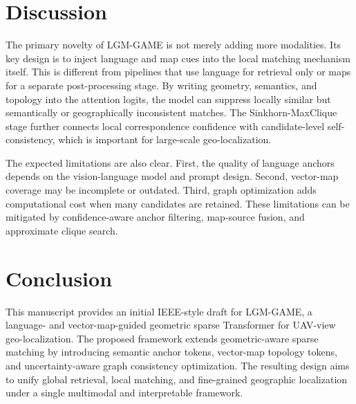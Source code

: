 \documentclass[journal]{IEEEtran}
\begin{document}
\section{Discussion}
The primary novelty of LGM-GAME is not merely adding more modalities. Its key design is to inject language and map cues into the local matching mechanism itself. This is different from pipelines that use language for retrieval only or maps for a separate post-processing stage. By writing geometry, semantics, and topology into the attention logits, the model can suppress locally similar but semantically or geographically inconsistent matches. The Sinkhorn-MaxClique stage further connects local correspondence confidence with candidate-level self-consistency, which is important for large-scale geo-localization.

The expected limitations are also clear. First, the quality of language anchors depends on the vision-language model and prompt design. Second, vector-map coverage may be incomplete or outdated. Third, graph optimization adds computational cost when many candidates are retained. These limitations can be mitigated by confidence-aware anchor filtering, map-source fusion, and approximate clique search.

\section{Conclusion}
This manuscript provides an initial IEEE-style draft for LGM-GAME, a language- and vector-map-guided geometric sparse Transformer for UAV-view geo-localization. The proposed framework extends geometric-aware sparse matching by introducing semantic anchor tokens, vector-map topology tokens, and uncertainty-aware graph consistency optimization. The resulting design aims to unify global retrieval, local matching, and fine-grained geographic localization under a single multimodal and interpretable framework.



\end{document}
